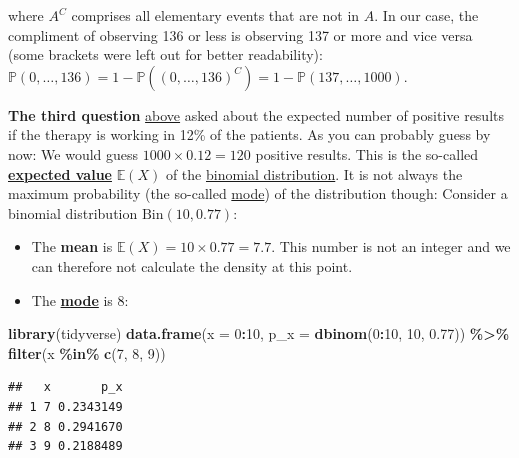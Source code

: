\documentclass[
]{book}
\newenvironment{Shaded}{\begin{snugshade}}{\end{snugshade}}
\newcommand{\AttributeTok}[1]{\textcolor[rgb]{0.13,0.29,0.53}{#1}}
\newcommand{\DecValTok}[1]{\textcolor[rgb]{0.00,0.00,0.81}{#1}}
\newcommand{\FloatTok}[1]{\textcolor[rgb]{0.00,0.00,0.81}{#1}}
\newcommand{\FunctionTok}[1]{\textcolor[rgb]{0.13,0.29,0.53}{\textbf{#1}}}
\newcommand{\NormalTok}[1]{#1}
\newcommand{\SpecialCharTok}[1]{\textcolor[rgb]{0.81,0.36,0.00}{\textbf{#1}}}
\providecommand{\tightlist}{%
  \setlength{\itemsep}{0pt}\setlength{\parskip}{0pt}}
\begin{document}
where \(A^C\) comprises all elementary events that are not in \(A\). In our case, the compliment of observing 136 or
less is observing 137 or more and vice versa (some brackets were left out for better readability):
\(\mathbb{P}(0, \dots, 136) = 1 - \mathbb{P}((0, \dots, 136)^C) = 1 - \mathbb{P}(137, \dots, 1000)\).

\textbf{The third question} \hyperref[Questions_about_the_1000-researcher_experiment]{above}
asked about the expected number of positive results if the therapy is working in 12\% of the patients.
As you can probably guess by now: We would guess \(1000 \times 0.12 = 120\) positive results.
This is the so-called \textbf{\href{https://en.wikipedia.org/wiki/Expected_value}{expected value}} \(\mathbb{E}(X)\) of the \href{https://en.wikipedia.org/wiki/Binomial_distribution}{binomial distribution}.
It is not always the maximum probability (the so-called \href{https://en.wikipedia.org/wiki/Mode_(statistics)}{mode}) of the distribution though:
Consider a binomial distribution \(\text{Bin}(10, 0.77)\):

\begin{itemize}
\tightlist
\item
  The \textbf{mean} is \(\mathbb{E}(X) = 10 \times 0.77 = 7.7\). This number is not an integer and we can therefore not calculate the density at this point.
\item
  The \textbf{\href{https://en.wikipedia.org/wiki/Mode_(statistics)}{mode}} is 8:
\end{itemize}

\begin{Shaded}
\begin{Highlighting}[]
\FunctionTok{library}\NormalTok{(tidyverse)}
\FunctionTok{data.frame}\NormalTok{(}\AttributeTok{x =} \DecValTok{0}\SpecialCharTok{:}\DecValTok{10}\NormalTok{,}
           \AttributeTok{p\_x =} \FunctionTok{dbinom}\NormalTok{(}\DecValTok{0}\SpecialCharTok{:}\DecValTok{10}\NormalTok{, }\DecValTok{10}\NormalTok{, }\FloatTok{0.77}\NormalTok{)) }\SpecialCharTok{\%\textgreater{}\%}
  \FunctionTok{filter}\NormalTok{(x }\SpecialCharTok{\%in\%} \FunctionTok{c}\NormalTok{(}\DecValTok{7}\NormalTok{, }\DecValTok{8}\NormalTok{, }\DecValTok{9}\NormalTok{))}
\end{Highlighting}
\end{Shaded}

\begin{verbatim}
##   x       p_x
## 1 7 0.2343149
## 2 8 0.2941670
## 3 9 0.2188489
\end{verbatim}
\end{document}
